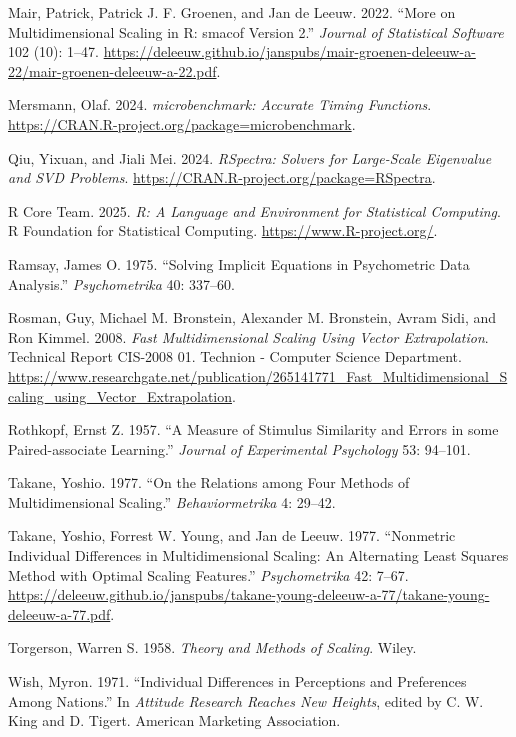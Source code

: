 \documentclass[
  12pt,
  letterpaper,
  DIV=11,
  numbers=noendperiod]{scrartcl}
\newlength{\cslhangindent}
\newenvironment{CSLReferences}[2] %
 {\begin{list}{}{%
  \setlength{\itemindent}{0pt}
  \setlength{\leftmargin}{0pt}
  \setlength{\parsep}{0pt}
  \ifodd #1
   \setlength{\leftmargin}{\cslhangindent}
   \setlength{\itemindent}{-1\cslhangindent}
  \fi
  \setlength{\itemsep}{#2\baselineskip}}}
 {\end{list}}
\begin{document}
\begin{CSLReferences}{1}{1}
{Mair, Patrick, Patrick J. F. Groenen, and Jan de Leeuw}. 2022. {``{More
on Multidimensional Scaling in R: smacof Version 2}.''} \emph{Journal of
Statistical Software} 102 (10): 1--47.
\url{https://deleeuw.github.io/janspubs/mair-groenen-deleeuw-a-22/mair-groenen-deleeuw-a-22.pdf}.

Mersmann, Olaf. 2024. \emph{{microbenchmark: Accurate Timing
Functions}}. \url{https://CRAN.R-project.org/package=microbenchmark}.

Qiu, Yixuan, and Jiali Mei. 2024. \emph{{RSpectra: Solvers for
Large-Scale Eigenvalue and SVD Problems}}.
\url{https://CRAN.R-project.org/package=RSpectra}.

R Core Team. 2025. \emph{R: A Language and Environment for Statistical
Computing}. R Foundation for Statistical Computing.
\url{https://www.R-project.org/}.

Ramsay, James O. 1975. {``Solving Implicit Equations in Psychometric
Data Analysis.''} \emph{Psychometrika} 40: 337--60.

Rosman, Guy, Michael M. Bronstein, Alexander M. Bronstein, Avram Sidi,
and Ron Kimmel. 2008. \emph{Fast Multidimensional Scaling Using Vector
Extrapolation}. Technical Report CIS-2008 01. Technion - Computer
Science Department.
\url{https://www.researchgate.net/publication/265141771_Fast_Multidimensional_Scaling_using_Vector_Extrapolation}.

Rothkopf, Ernst Z. 1957. {``{A Measure of Stimulus Similarity and Errors
in some Paired-associate Learning}.''} \emph{Journal of Experimental
Psychology} 53: 94--101.

Takane, Yoshio. 1977. {``{On the Relations among Four Methods of
Multidimensional Scaling}.''} \emph{Behaviormetrika} 4: 29--42.

{Takane, Yoshio, Forrest W. Young, and Jan de Leeuw}. 1977.
{``{Nonmetric Individual Differences in Multidimensional Scaling: An
Alternating Least Squares Method with Optimal Scaling Features}.''}
\emph{Psychometrika} 42: 7--67.
\url{https://deleeuw.github.io/janspubs/takane-young-deleeuw-a-77/takane-young-deleeuw-a-77.pdf}.

Torgerson, Warren S. 1958. \emph{{Theory and Methods of Scaling}}.
Wiley.

Wish, Myron. 1971. {``Individual Differences in Perceptions and
Preferences Among Nations.''} In \emph{Attitude Research Reaches New
Heights}, edited by C. W. King and D. Tigert. American Marketing
Association.

\end{CSLReferences}
\end{document}
